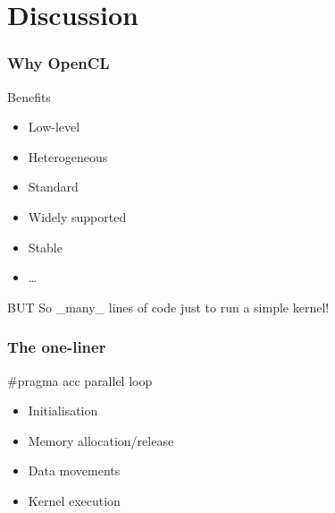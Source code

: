 \section{Discussion}
\begin{frame}
  \frametitle{Why OpenCL}
  \begin{block}{Benefits}
    \begin{itemize}
    \item Low-level
    \item Heterogeneous
    \item Standard
    \item Widely supported
    \item Stable
    \item \ldots
    \end{itemize}
  \end{block}
  \pause{}
  \begin{alertblock}{BUT}
    So \_many\_ lines of code just to run a simple kernel!
  \end{alertblock}
\end{frame}

\begin{frame}
  \frametitle{The one-liner}
  \pause{}
   \pause{}
  \begin{alertblock}{\#pragma acc parallel loop}
    \begin{itemize}
    \item Initialisation
    \item Memory allocation/release
    \item Data movements
    \item Kernel execution
    \end{itemize}
  \end{alertblock}
\end{frame}

